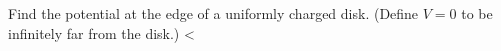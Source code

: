 Find the potential at the edge of a uniformly charged
        disk. (Define $V=0$ to be infinitely far from the disk.)
        \answercheck<%

